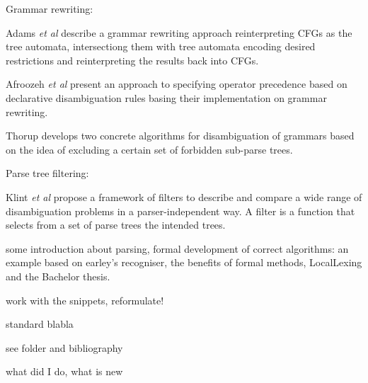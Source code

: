 \begin{isabellebody}
\begin{isamarkuptext}
Grammar rewriting:

Adams \textit{et al} \cite{Adams:2017} describe a grammar rewriting approach reinterpreting CFGs as
the tree automata, intersectiong them with tree automata encoding desired restrictions and reinterpreting
the results back into CFGs.

Afroozeh \textit{et al} \cite{Afroozeh:2013} present an approach to specifying operator precedence
based on declarative disambiguation rules basing their implementation on grammar rewriting.

Thorup \cite{Thorup:1996} develops two concrete algorithms for disambiguation of grammars based on the idea of 
excluding a certain set of forbidden sub-parse trees.

Parse tree filtering:

Klint \textit{et al} \cite{Klint:1997} propose a framework of filters to describe and compare a wide
range of disambiguation problems in a parser-independent way. A filter is a function that selects
from a set of parse trees the intended trees.%
\end{isamarkuptext}\isamarkuptrue%
%
\isadelimdocument
%
\endisadelimdocument
%
\isatagdocument
%
\isamarkuptrue%
%
\isamarkuptrue%
%
\endisatagdocument
{\isafolddocument}%
%
\isadelimdocument
%
\endisadelimdocument
%
\begin{isamarkuptext}%
some introduction about parsing, formal development of correct algorithms: an example based on
earley's recogniser, the benefits of formal methods, LocalLexing and the Bachelor thesis.%
\end{isamarkuptext}\isamarkuptrue%
%
\begin{isamarkuptext}%
work with the snippets, reformulate!%
\end{isamarkuptext}\isamarkuptrue%
%
\isadelimdocument
%
\endisadelimdocument
%
\isatagdocument
%
\isamarkuptrue%
%
\endisatagdocument
{\isafolddocument}%
%
\isadelimdocument
%
\endisadelimdocument
%
\begin{isamarkuptext}%
standard blabla%
\end{isamarkuptext}\isamarkuptrue%
%
\isadelimdocument
%
\endisadelimdocument
%
\isatagdocument
%
\isamarkuptrue%
%
\endisatagdocument
{\isafolddocument}%
%
\isadelimdocument
%
\endisadelimdocument
%
\begin{isamarkuptext}%
see folder and bibliography%
\end{isamarkuptext}\isamarkuptrue%
%
\isadelimdocument
%
\endisadelimdocument
%
\isatagdocument
%
\isamarkuptrue%
%
\endisatagdocument
{\isafolddocument}%
%
\isadelimdocument
%
\endisadelimdocument
%
\begin{isamarkuptext}%
what did I do, what is new%
\end{isamarkuptext}\isamarkuptrue%
%
\isadelimtheory
%
\endisadelimtheory
%
\isatagtheory
%
\endisatagtheory
{\isafoldtheory}%
%
\isadelimtheory
%
\endisadelimtheory
%
\end{isabellebody}%
